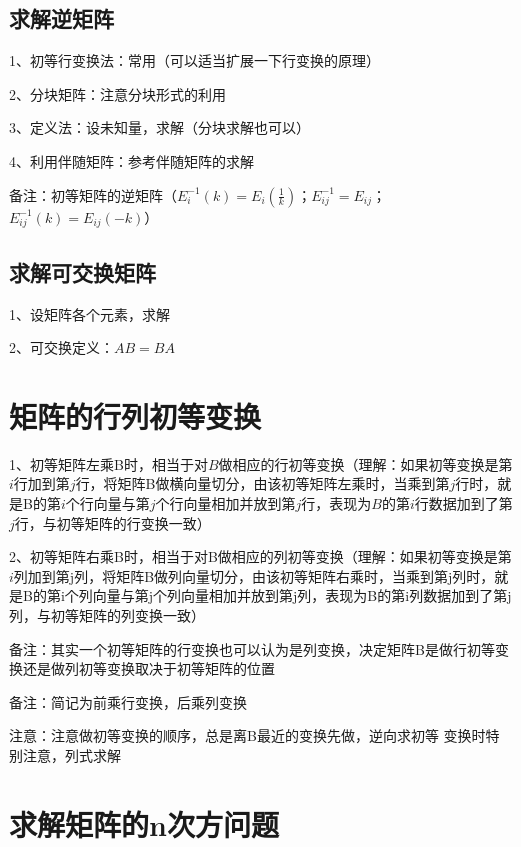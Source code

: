 \subsection{求解逆矩阵}

1、初等行变换法：常用（可以适当扩展一下行变换的原理）

2、分块矩阵：注意分块形式的利用

3、定义法：设未知量，求解（分块求解也可以）

4、利用伴随矩阵：参考伴随矩阵的求解

备注：初等矩阵的逆矩阵（$E_{i}^{-1}(k)=E_{i}(\frac 1 k)$；$E_{ij}^{-1}=E_{ij}$；$E_{ij}^{-1}(k)=E_{ij}(-k)$）



\subsection{求解可交换矩阵}

1、设矩阵各个元素，求解

2、可交换定义：$AB=BA$

\section{矩阵的行列初等变换}

1、初等矩阵左乘B时，相当于对$B$做相应的行初等变换（理解：如果初等变换是第$i$行加到第$j$行，将矩阵B做横向量切分，由该初等矩阵左乘时，当乘到第$j$行时，就是B的第$i$个行向量与第$j$个行向量相加并放到第$j$行，表现为$B$的第$i$行数据加到了第$j$行，与初等矩阵的行变换一致）

2、初等矩阵右乘B时，相当于对B做相应的列初等变换（理解：如果初等变换是第$i$列加到第j列，将矩阵B做列向量切分，由该初等矩阵右乘时，当乘到第j列时，就是B的第i个列向量与第j个列向量相加并放到第j列，表现为B的第i列数据加到了第j列，与初等矩阵的列变换一致）

备注：其实一个初等矩阵的行变换也可以认为是列变换，决定矩阵B是做行初等变换还是做列初等变换取决于初等矩阵的位置

备注：简记为前乘行变换，后乘列变换

注意：注意做初等变换的顺序，总是离B最近的变换先做，逆向求初等 变换时特别注意，列式求解

\section{求解矩阵的n次方问题}

